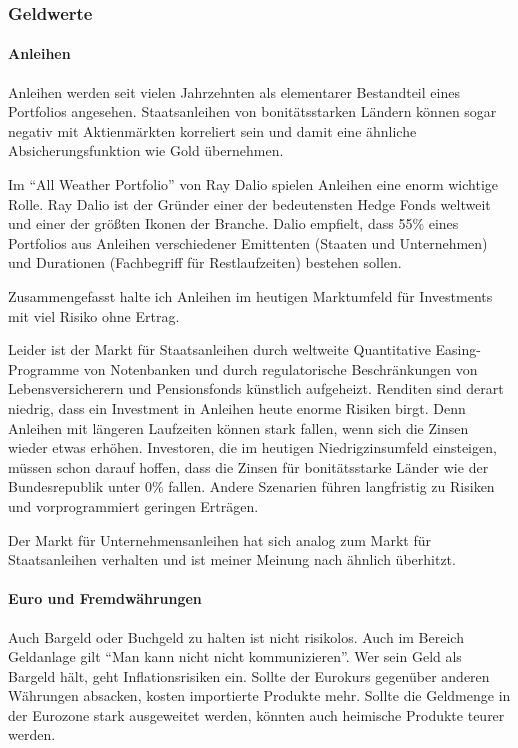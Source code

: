 \documentclass{article}
\begin{document}
\subsubsection{Geldwerte}

\paragraph{Anleihen}

Anleihen werden seit vielen Jahrzehnten als elementarer Bestandteil eines Portfolios angesehen. Staatsanleihen von bonitätsstarken Ländern können sogar negativ mit Aktienmärkten korreliert sein und damit eine ähnliche Absicherungsfunktion wie Gold übernehmen.

Im ``All Weather Portfolio'' von Ray Dalio spielen Anleihen eine enorm wichtige Rolle. Ray Dalio ist der Gründer einer der bedeutensten Hedge Fonds weltweit und einer der größten Ikonen der Branche. Dalio empfielt, dass 55\% eines Portfolios aus Anleihen verschiedener Emittenten (Staaten und Unternehmen) und Durationen (Fachbegriff für Restlaufzeiten) bestehen sollen.

Zusammengefasst halte ich Anleihen im heutigen Marktumfeld für Investments mit viel Risiko ohne Ertrag.

Leider ist der Markt für Staatsanleihen durch weltweite Quantitative Easing-Programme von Notenbanken und durch regulatorische Beschränkungen von Lebensversicherern und Pensionsfonds künstlich aufgeheizt. Renditen sind derart niedrig, dass ein Investment in Anleihen heute enorme Risiken birgt. Denn Anleihen mit längeren Laufzeiten können stark fallen, wenn sich die Zinsen wieder etwas erhöhen. Investoren, die im heutigen Niedrigzinsumfeld einsteigen, müssen schon darauf hoffen, dass die Zinsen für bonitätsstarke Länder wie der Bundesrepublik unter 0\% fallen. Andere Szenarien führen langfristig zu Risiken und vorprogrammiert geringen Erträgen.

Der Markt für Unternehmensanleihen hat sich analog zum Markt für Staatsanleihen verhalten und ist meiner Meinung nach ähnlich überhitzt.



\paragraph{Euro und Fremdwährungen}

Auch Bargeld oder Buchgeld zu halten ist nicht risikolos. Auch im Bereich Geldanlage gilt ``Man kann nicht nicht kommunizieren''. Wer sein Geld als Bargeld hält, geht Inflationsrisiken ein. Sollte der Eurokurs gegenüber anderen Währungen absacken, kosten importierte Produkte mehr. Sollte die Geldmenge in der Eurozone stark ausgeweitet werden, könnten auch heimische Produkte teurer werden.
\end{document}
